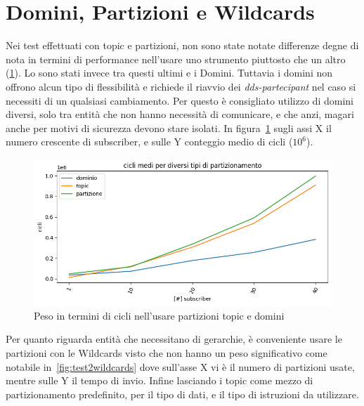 \section{Domini, Partizioni e Wildcards}
Nei test effettuati con topic e partizioni, non sono state notate differenze degne di nota in termini di performance nell'usare uno strumento piuttosto che un altro (\ref{fig:test2parttopicdomain}). Lo sono stati invece tra questi ultimi e i Domini. Tuttavia i domini non offrono alcun tipo di flessibilità e richiede il riavvio dei \emph{dds-partecipant} nel caso si necessiti di un qualsiasi cambiamento. Per questo è consigliato utilizzo di domini diversi, solo tra entità che non hanno necessità di comunicare, e che anzi, magari anche per motivi di sicurezza devono stare isolati. 
In figura~\ref{fig:test2parttopicdomain} sugli assi X il numero crescente di subscriber, e sulle Y conteggio medio di cicli ($10^6$).

\begin{figure}[H]
    \includegraphics[width=\textwidth]{./results/test2_cicli_partvstopicvsdomaain.png} 
        \caption{Peso in termini di cicli nell'usare partizioni topic e domini}\label{fig:test2parttopicdomain}
\end{figure}

Per quanto riguarda entità che necessitano di gerarchie, è conveniente usare le partizioni con le Wildcards visto che non hanno un peso significativo come notabile in~\ref{fig:test2wildcards} dove sull'asse X vi è il numero di partizioni usate, mentre sulle Y il tempo di invio. Infine lasciando i topic come mezzo di partizionamento predefinito, per il tipo di dati, e il tipo di istruzioni da utilizzare.

